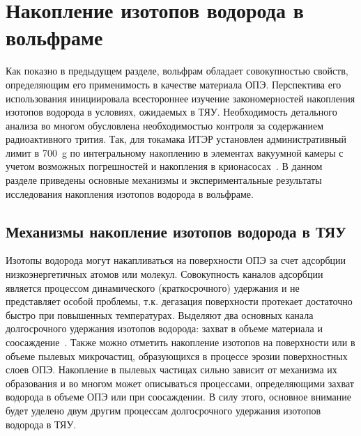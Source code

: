 \section{Накопление изотопов водорода в вольфраме}

Как показно в предыдущем разделе, вольфрам обладает совокупностью свойств, определяющим его применимость в качестве материала ОПЭ. Перспектива его использования инициировала всестороннее изучение закономерностей накопления изотопов водорода в условиях, ожидаемых в ТЯУ. Необходимость детального анализа во многом обусловлена необходимостью контроля за содержанием радиоактивного трития. Так, для токамака ИТЭР установлен административный лимит в \SI{700}{\gram} по интегральному накоплению в элементах вакуумной камеры с учетом возможных погрешностей и накопления в крионасосах~\cite{Roth1}. В данном разделе приведены основные механизмы и экспериментальные результаты исследования накопления изотопов водорода в вольфраме.

\subsection{Механизмы накопление изотопов водорода в ТЯУ}

Изотопы водорода могут накапливаться на поверхности ОПЭ за счет адсорбции низкоэнергетичных атомов или молекул. Совокупность каналов адсорбции является процессом динамического (краткосрочного) удержания и не представляет особой проблемы, т.к. дегазация поверхности протекает достаточно быстро при повышенных температурах. Выделяют два основных канала долгосрочного удержания изотопов водорода: захват в объеме материала и соосаждение~\cite{Gasparyan2024, Skinner2009}. Также можно отметить накопление изотопов на поверхности или в объеме пылевых микрочастиц, образующихся в процессе эрозии поверхностных слоев ОПЭ. Накопление в пылевых частицах сильно зависит от механизма их образования и во многом может описываться процессами, определяющими захват водорода в объеме ОПЭ или при соосаждении. В силу этого, основное внимание будет уделено двум другим процессам долгосрочного удержания изотопов водорода в ТЯУ.


